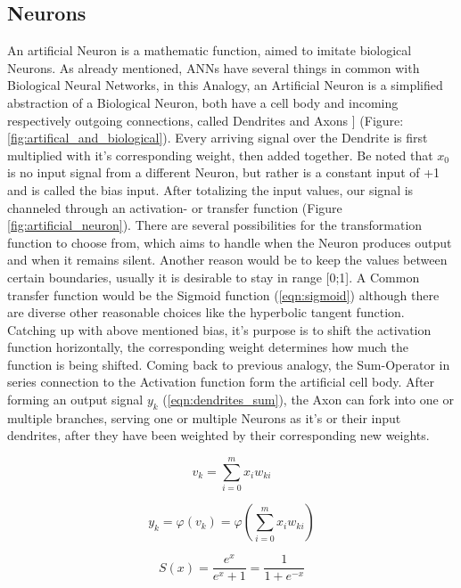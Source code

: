 \subsection{Neurons}
An artificial Neuron is a mathematic function, aimed to imitate biological Neurons.
As already mentioned, ANNs have several things in common with Biological Neural Networks, in this Analogy, an Artificial Neuron is a simplified abstraction of a Biological Neuron, both have a cell body and incoming respectively outgoing connections, called Dendrites and Axons \cite{nntutorial}] (Figure: \ref{fig:artifical_and_biological}). Every arriving signal over the Dendrite is first multiplied with it's corresponding weight, then added together. Be noted that $x_{0}$ is no input signal from a different Neuron, but rather is a constant input of +1 and is called the bias input. \newline
After totalizing the input values, our signal is channeled through an activation- or transfer function (Figure \ref{fig:artificial_neuron}). There are several possibilities for the transformation function to choose from, which aims to handle when the Neuron produces output and when it remains silent. Another reason would be to keep the values between certain boundaries, usually it is desirable to stay in range [0;1]. A Common transfer function would be the Sigmoid function (\ref{eqn:sigmoid}) although there are diverse other reasonable choices like the hyperbolic tangent function. Catching up with above mentioned bias, it's purpose is to shift the activation function horizontally, the corresponding weight determines how much the function is being shifted. Coming back to previous analogy, the Sum-Operator in series connection to the Activation function form the artificial cell body.\newline 
After forming an output signal $y_{k}$ (\ref{eqn:dendrites_sum}), the Axon can fork into one or multiple branches, serving one or multiple Neurons as it's or their input dendrites, after they have been weighted by their corresponding new weights.   


\begin{equation}
\label{eqn:vk}
	v_{k} = \sum_{i=0}^{m} x_{i} w_{ki}
\end{equation}  

\begin{equation}
	\label{eqn:dendrites_sum}
	y_{k} = \varphi(v_{k}) = \varphi(\sum_{i=0}^{m} x_{i} w_{ki}) 
\end{equation} 

\begin{equation}
	\label{eqn:sigmoid}
	S(x) = \frac{e^x}{e^x + 1} = \frac{1}{1 + e^{-x}}
\end{equation} 



